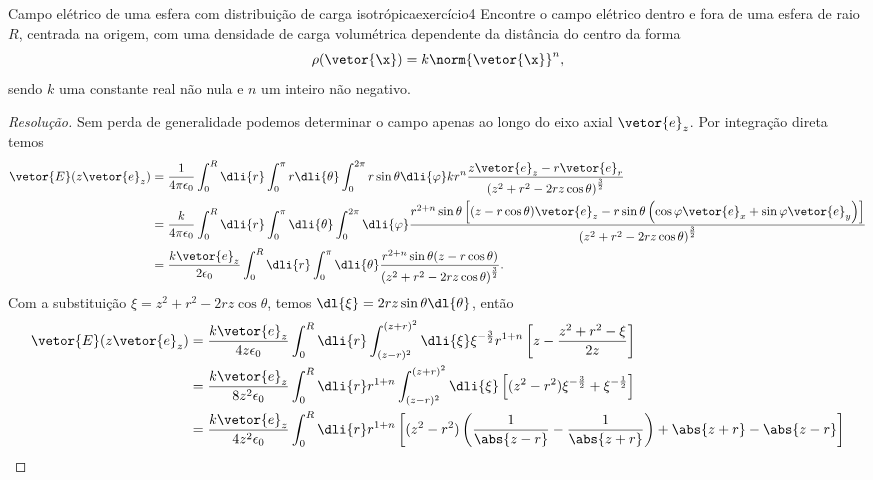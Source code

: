 \begin{exercício}{Campo elétrico de uma esfera com distribuição de carga isotrópica}{exercício4}
    Encontre o campo elétrico dentro e fora de uma esfera de raio \(R\), centrada na origem, com uma densidade de carga volumétrica dependente da distância do centro da forma
    \begin{equation*}
     \rho(\vetor{\x}) = k \norm{\vetor{\x}}^n,
    \end{equation*}
    sendo \(k\) uma constante real não nula e \(n\) um inteiro não negativo.
\end{exercício}
\begin{proof}[Resolução]
    Sem perda de generalidade podemos determinar o campo apenas ao longo do eixo axial \(\vetor{e}_z\). Por integração direta temos
    \begin{align*}
        \vetor{E}(z\vetor{e}_z) &= \frac{1}{4\pi \epsilon_0} \int_{0}^R \dli{r} \int_{0}^{\pi} r\dli{\theta} \int_{0}^{2\pi} r\sin\theta \dli{\varphi} kr^n\frac{z\vetor{e}_z - r\vetor{e}_r}{\left(z^2 + r^2 - 2rz \cos\theta\right)^{\frac32}}\\
                                &= \frac{k}{4\pi \epsilon_0} \int_{0}^{R} \dli{r} \int_{0}^{\pi} \dli{\theta} \int_{0}^{2\pi} \dli{\varphi} \frac{r^{2+n} \sin\theta\left[(z - r \cos \theta) \vetor{e}_z - r\sin\theta \left(\cos\varphi \vetor{e}_x + \sin\varphi\vetor{e}_y\right) \right]}{\left(z^2 + r^2 - 2rz \cos\theta\right)^{\frac32}}\\
                                &= \frac{k\vetor{e}_z}{2\epsilon_0} \int_{0}^{R} \dli{r} \int_{0}^{\pi} \dli{\theta} \frac{r^{2+n} \sin\theta(z - r \cos \theta)  }{\left(z^2 + r^2 - 2rz \cos\theta\right)^{\frac32}}.
    \end{align*}
    Com a substituição \(\xi = z^2 + r^2 - 2rz \cos\theta\), temos \(\dl{\xi} = 2rz \sin\theta \dl{\theta}\), então
    \begin{align*}
        \vetor{E}(z\vetor{e}_z) &= \frac{k\vetor{e}_z}{4z \epsilon_0} \int_0^R\dli{r} \int_{(z - r)^2}^{(z+r)^2} \dli{\xi} \xi^{-\frac32} r^{1 + n} \left[z - \frac{z^2 + r^2 - \xi}{2z}\right]\\
                                &= \frac{k\vetor{e}_z}{8z^2 \epsilon_0} \int_0^R \dli{r} r^{1 + n} \int_{(z-r)^2}^{(z+r)^2}\dli{\xi} \left[(z^2 - r^2)\xi^{-\frac32} + \xi^{-\frac12}\right]\\
                                &= \frac{k\vetor{e}_z}{4z^2 \epsilon_0} \int_0^R \dli{r} r^{1+n} \left[(z^2 - r^2)\left(\frac{1}{\abs{z-r}} - \frac{1}{\abs{z+r}}\right) + \abs{z+r} - \abs{z - r}\right]\\

\end{align*}
\end{proof}

